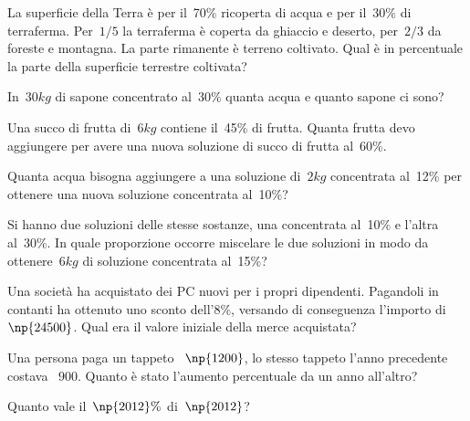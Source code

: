 \begin{multicols}{2}
\begin{esercizio}[\Ast]
 \label{ese:3.110}
La superficie della Terra è per il~70\% ricoperta di acqua e per il~30\% di terraferma.
Per~$1/5$ la terraferma è coperta da ghiaccio e deserto, per~$2/3$ da foreste e montagna.
La parte rimanente è terreno coltivato. Qual è in percentuale la parte della superficie terrestre coltivata?
\end{esercizio}

\begin{esercizio}[\Ast]
 \label{ese:3.111}
In~$30\unit{kg}$ di sapone concentrato al~30\% quanta acqua e quanto sapone ci sono?
\end{esercizio}

\begin{esercizio}
 \label{ese:3.112}
Una succo di frutta di~$6\unit{kg}$ contiene il~45\% di frutta. Quanta frutta devo aggiungere per avere una nuova soluzione di succo di frutta al~60\%.
\end{esercizio}

\begin{esercizio}
 \label{ese:3.113}
Quanta acqua bisogna aggiungere a una soluzione di~$2\unit{kg}$
concentrata al~12\% per ottenere una nuova soluzione concentrata al~10\%?
\end{esercizio}

\begin{esercizio}
 \label{ese:3.114}
Si hanno due soluzioni delle stesse sostanze, una concentrata al~10\% e l'altra al~30\%.
In quale proporzione occorre miscelare le due soluzioni in modo da ottenere~$6\unit{kg}$
di soluzione concentrata al~15\%?
\end{esercizio}

\begin{esercizio}
 \label{ese:3.115}
Una società ha acquistato dei PC nuovi per i propri dipendenti. Pagandoli in contanti ha ottenuto uno sconto dell'8\%,
versando di conseguenza l'importo di \officialeuro~$\np{24500}$. Qual era il valore iniziale della merce acquistata?
\end{esercizio}

\begin{esercizio}
 \label{ese:3.116}
Una persona paga un tappeto \officialeuro~$\np{1200}$, lo stesso tappeto l'anno precedente costava \officialeuro~$900$.
Quanto è stato l'aumento percentuale da un anno all'altro?
\end{esercizio}

\begin{esercizio}
 \label{ese:3.117}
Quanto vale il~$\np{2012}\%$ di~$\np{2012}$?
\end{esercizio}
\end{multicols}

